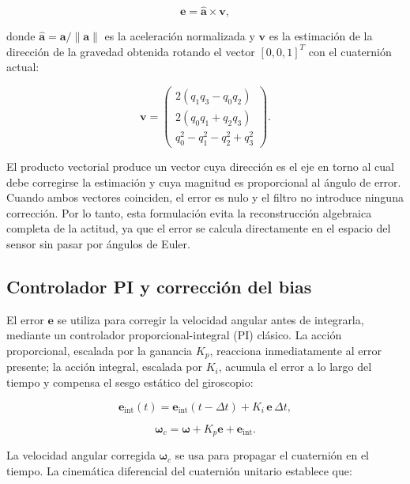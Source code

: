 \documentclass[12pt]{article}
\begin{document}
\begin{equation}
\mathbf{e} = \hat{\mathbf{a}} \times \mathbf{v},
\end{equation}

donde $\hat{\mathbf{a}} = \mathbf{a}/\|\mathbf{a}\|$ es la aceleración normalizada y $\mathbf{v}$ es la estimación de la dirección de la gravedad obtenida rotando el vector $[0,0,1]^T$ con el cuaternión actual:

\begin{equation}
\mathbf{v} =
\begin{pmatrix}
2(q_1 q_3 - q_0 q_2) \\
2(q_0 q_1 + q_2 q_3) \\
q_0^2 - q_1^2 - q_2^2 + q_3^2
\end{pmatrix}.
\end{equation}

El producto vectorial produce un vector cuya dirección es el eje en torno al cual debe corregirse la estimación y cuya magnitud es proporcional al ángulo de error. Cuando ambos vectores coinciden, el error es nulo y el filtro no introduce ninguna corrección. Por lo tanto, esta formulación evita la reconstrucción algebraica completa de la actitud, ya que el error se calcula directamente en el espacio del sensor sin pasar por ángulos de Euler.

\subsection{Controlador PI y corrección del bias}

El error $\mathbf{e}$ se utiliza para corregir la velocidad angular antes de integrarla, mediante un controlador proporcional-integral (PI) clásico. La acción proporcional, escalada por la ganancia $K_p$, reacciona inmediatamente al error presente; la acción integral, escalada por $K_i$, acumula el error a lo largo del tiempo y compensa el sesgo estático del giroscopio:

\begin{equation}
\mathbf{e}_{\text{int}}(t) = \mathbf{e}_{\text{int}}(t - \Delta t) + K_i \, \mathbf{e} \, \Delta t,
\end{equation}

\begin{equation}
\boldsymbol{\omega}_c = \boldsymbol{\omega} + K_p \mathbf{e} + \mathbf{e}_{\text{int}}.
\end{equation}

La velocidad angular corregida $\boldsymbol{\omega}_c$ se usa para propagar el cuaternión en el tiempo. La cinemática diferencial del cuaternión unitario establece que:
\end{document}

